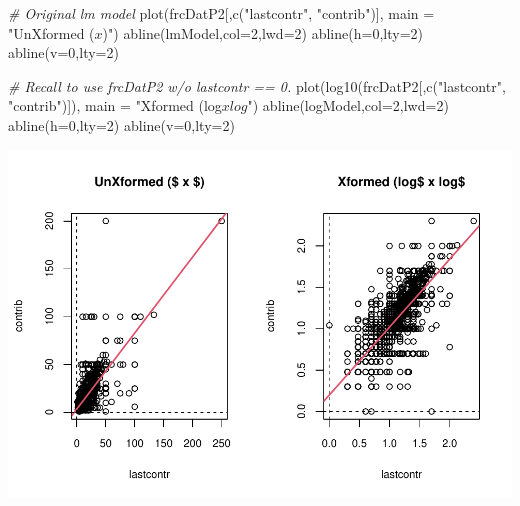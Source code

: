 \documentclass[
]{article}
\newenvironment{Shaded}{\begin{snugshade}}{\end{snugshade}}
\newcommand{\AttributeTok}[1]{\textcolor[rgb]{0.77,0.63,0.00}{#1}}
\newcommand{\CommentTok}[1]{\textcolor[rgb]{0.56,0.35,0.01}{\textit{#1}}}
\newcommand{\DecValTok}[1]{\textcolor[rgb]{0.00,0.00,0.81}{#1}}
\newcommand{\FunctionTok}[1]{\textcolor[rgb]{0.00,0.00,0.00}{#1}}
\newcommand{\NormalTok}[1]{#1}
\newcommand{\StringTok}[1]{\textcolor[rgb]{0.31,0.60,0.02}{#1}}
\begin{document}
\begin{Shaded}
\begin{Highlighting}[]
\CommentTok{\# Original lm model}
\FunctionTok{plot}\NormalTok{(frcDatP2[,}\FunctionTok{c}\NormalTok{(}\StringTok{"lastcontr"}\NormalTok{, }\StringTok{"contrib"}\NormalTok{)], }
     \AttributeTok{main =} \StringTok{"UnXformed ($ x $)"}\NormalTok{)}
\FunctionTok{abline}\NormalTok{(lmModel,}\AttributeTok{col=}\DecValTok{2}\NormalTok{,}\AttributeTok{lwd=}\DecValTok{2}\NormalTok{)}
\FunctionTok{abline}\NormalTok{(}\AttributeTok{h=}\DecValTok{0}\NormalTok{,}\AttributeTok{lty=}\DecValTok{2}\NormalTok{)}
\FunctionTok{abline}\NormalTok{(}\AttributeTok{v=}\DecValTok{0}\NormalTok{,}\AttributeTok{lty=}\DecValTok{2}\NormalTok{)}

\CommentTok{\# Recall to use frcDatP2 w/o lastcontr == 0.}
\FunctionTok{plot}\NormalTok{(}\FunctionTok{log10}\NormalTok{(frcDatP2[,}\FunctionTok{c}\NormalTok{(}\StringTok{"lastcontr"}\NormalTok{, }\StringTok{"contrib"}\NormalTok{)]),}
     \AttributeTok{main =} \StringTok{"Xformed (log$ x log$"}\NormalTok{)}
\FunctionTok{abline}\NormalTok{(logModel,}\AttributeTok{col=}\DecValTok{2}\NormalTok{,}\AttributeTok{lwd=}\DecValTok{2}\NormalTok{)}
\FunctionTok{abline}\NormalTok{(}\AttributeTok{h=}\DecValTok{0}\NormalTok{,}\AttributeTok{lty=}\DecValTok{2}\NormalTok{)}
\FunctionTok{abline}\NormalTok{(}\AttributeTok{v=}\DecValTok{0}\NormalTok{,}\AttributeTok{lty=}\DecValTok{2}\NormalTok{)}
\end{Highlighting}
\end{Shaded}

\includegraphics{linear_regression__uc_files/figure-latex/Problem2_Q2-2.pdf}
\end{document}
